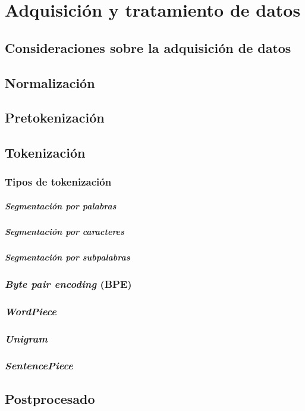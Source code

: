 \chapter{Adquisición y tratamiento de datos}
\section{Consideraciones sobre la adquisición de datos}
\section{Normalización}
\section{Pretokenización}
\section{Tokenización}
\subsection{Tipos de tokenización}
\paragraph{Segmentación por palabras}
\paragraph{Segmentación por caracteres}
\paragraph{Segmentación por subpalabras}
\subsection{\textit{Byte pair encoding} (BPE)}
\subsection{\textit{WordPiece}}
\subsection{\textit{Unigram}}
\subsection{\textit{SentencePiece}}
\section{Postprocesado}